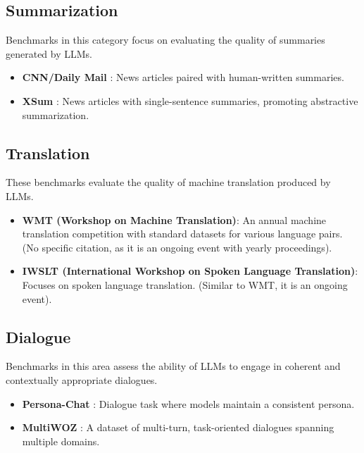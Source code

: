 \subsection{Summarization}

Benchmarks in this category focus on evaluating the quality of summaries generated by LLMs.

\begin{itemize}
    \item \textbf{CNN/Daily Mail} \cite{hermann2015teaching}: News articles paired with human-written summaries.
    \item \textbf{XSum} \cite{narayan2018don}: News articles with single-sentence summaries, promoting abstractive summarization.
\end{itemize}

\subsection{Translation}

These benchmarks evaluate the quality of machine translation produced by LLMs.

\begin{itemize}
    \item \textbf{WMT (Workshop on Machine Translation)}: An annual machine translation competition with standard datasets for various language pairs. (No specific citation, as it is an ongoing event with yearly proceedings).
    \item \textbf{IWSLT (International Workshop on Spoken Language Translation)}: Focuses on spoken language translation. (Similar to WMT, it is an ongoing event).
\end{itemize}

\subsection{Dialogue}

Benchmarks in this area assess the ability of LLMs to engage in coherent and contextually appropriate dialogues.

\begin{itemize}
    \item \textbf{Persona-Chat} \cite{zhang2018personalizing}: Dialogue task where models maintain a consistent persona.
    \item \textbf{MultiWOZ} \cite{budzianowski2018multiwoz}: A dataset of multi-turn, task-oriented dialogues spanning multiple domains.
\end{itemize}

